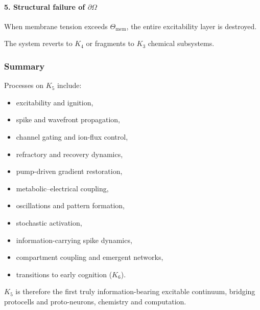 \paragraph{5. Structural failure of \texorpdfstring{$\partial\Omega$}{\partial\Omega}}
When membrane tension exceeds $\Theta_{\text{mem}}$,
the entire excitability layer is destroyed.

The system reverts to $K_4$ or fragments to $K_3$ chemical subsystems.

\subsubsection{Summary}

Processes on $K_5$ include:
\begin{itemize}
    \item excitability and ignition,
    \item spike and wavefront propagation,
    \item channel gating and ion-flux control,
    \item refractory and recovery dynamics,
    \item pump-driven gradient restoration,
    \item metabolic–electrical coupling,
    \item oscillations and pattern formation,
    \item stochastic activation,
    \item information-carrying spike dynamics,
    \item compartment coupling and emergent networks,
    \item transitions to early cognition ($K_6$).
\end{itemize}

$K_5$ is therefore the first truly information-bearing excitable 
continuum, bridging protocells and proto-neurons, chemistry and 
computation.
